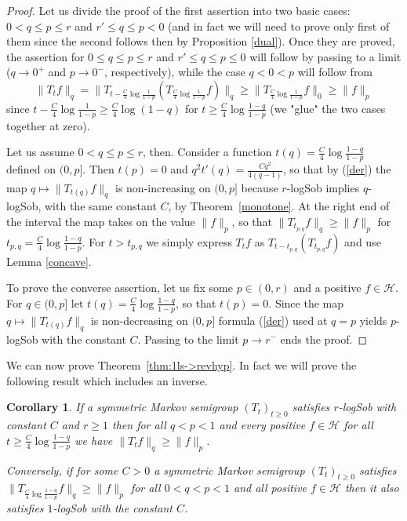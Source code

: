 \documentclass[11pt]{amsart}
\newcommand{\1}{\mathbf{1}}
\def\H{{\mathcal{H}}}
\theoremstyle{definition}
\theoremstyle{plain}
\newtheorem{corollary}[example]{Corollary}
\theoremstyle{remark}
\numberwithin{equation}{section}
\begin{document}
\begin{proof}
Let us divide the proof of the first assertion into two basic cases: $0<q \leq p\leq r$ and $r' \leq q \leq p<0$
(and in fact we will need to prove only first of them since the second follows then by Proposition \ref{dual}). Once they are proved, the assertion for $0 \leq q \leq p\leq r$ and $r' \leq q \leq p \leq 0$ will follow by passing to a limit ($q \to 0^{+}$ and $p \to 0^{-}$, respectively), while the case $q<0<p$ will follow from
\[
\| T_{t}f\|_{q}=\| T_{t-\frac{C}{4}\log \frac{1}{1-p}}(T_{\frac{C}{4}\log \frac{1}{1-p}}f)\|_{q} \geq
\| T_{\frac{C}{4}\log \frac{1}{1-p}}f\|_{0}
\geq \| f\|_{p}	
\]
since $t-\frac{C}{4}\log \frac{1}{1-p} \geq
\frac{C}{4}\log(1-q)$ for $t \geq \frac{C}{4}\log \frac{1-q}{1-p}$ (we "glue" the two cases together at zero).

Let us assume $0<q \leq p \leq r$, then. Consider a function
$t(q)=\frac{C}{4}\log \frac{1-q}{1-p}$ defined on $(0,p]$.
Then $t(p)=0$ and $q^{2}t'(q)=\frac{Cq^{2}}{4(q-1)}$, so that by (\ref{der}) the map $q \mapsto \| T_{t(q)}f\|_{q}$ is non-increasing on $(0,p]$ because $r$-logSob implies $q$-logSob, with the same constant $C$, by Theorem~\ref{monotone}. At the right end of the interval the map takes on the value $\| f\|_{p}$, so that $\| T_{t_{p,q}}f\|_{q} \geq \| f\|_{p}$ for $t_{p,q}=\frac{C}{4}\log \frac{1-q}{1-p}$. For $t>t_{p,q}$ we simply express $T_{t}f$ as
$T_{t-t_{p,q}}(T_{t_{p,q}}f)$ and use Lemma \ref{concave}.

To prove the converse assertion, let us fix some
$p \in (0,r)$ and a positive $f \in \H$.
For $q \in (0,p]$ let
$t(q)=\frac{C}{4}\log \frac{1-q}{1-p}$, so that $t(p)=0$.
Since the map $q \mapsto \| T_{t(q)}f\|_{q}$ is non-decreasing on $(0,p]$ formula (\ref{der}) used at $q=p$ yields $p$-logSob with the constant $C$. Passing to the limit $p \to r^{-}$ ends the proof.
\end{proof}

We can now prove Theorem~\ref{thm:1ls->revhyp}. In fact we will prove the following result which includes an inverse.

\begin{corollary} \label{1ls->revhyp}
If a symmetric Markov semigroup $(T_{t})_{t \geq 0}$ satisfies $r$-logSob with constant $C$ and $r \geq 1$ then for all
$q<p<1$ and every positive $f \in \H$ for all
$t \geq \frac{C}{4}\log \frac{1-q}{1-p}$ we have
$\| T_{t}f\|_{q} \geq \| f\|_{p}$.

Conversely, if for some $C>0$ a symmetric Markov semigroup
$(T_{t})_{t \geq 0}$ satisfies
$\| T_{\frac{C}{4}\log \frac{1-q}{1-p}}f\|_{q} \geq \| f\|_{p}$ for all $0<q<p<1$ and all positive $f \in \H$ then
it also satisfies $1$-logSob with the constant $C$.
\end{corollary}
\end{document}
